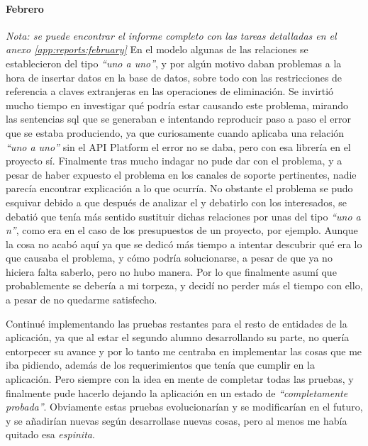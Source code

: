 \paragraph{Febrero}
\textit{Nota: se puede encontrar el informe completo con las tareas detalladas
en el anexo \ref{app:reports:february}}
En el modelo algunas de las relaciones se establecieron del tipo \textit{``uno a uno''},
y por algún motivo daban problemas a la hora de insertar datos en la base de datos,
sobre todo con las restricciones de referencia a claves extranjeras en las
operaciones de eliminación. Se invirtió mucho tiempo en investigar qué podría estar
causando este problema, mirando las sentencias \gls{sql} que se generaban e intentando
reproducir paso a paso el error que se estaba produciendo, ya que curiosamente cuando
aplicaba una relación \textit{``uno a uno''} sin el 
API Platform el error no se daba, pero con esa librería en el proyecto sí. Finalmente
tras mucho indagar no pude dar con el problema, y a pesar de haber expuesto
el problema en los canales de soporte pertinentes, nadie parecía encontrar explicación
a lo que ocurría. No obstante el problema se pudo esquivar debido a que después
de analizar el  y debatirlo con los
interesados, se debatió que tenía más sentido sustituir dichas relaciones por unas
del tipo \textit{``uno a n''}, como era en el caso de los presupuestos de un
proyecto, por ejemplo. Aunque la cosa no acabó aquí ya que se dedicó más tiempo a
intentar descubrir qué era lo que causaba el problema, y cómo podría solucionarse,
a pesar de que ya no hiciera falta saberlo, pero no hubo manera. Por lo que finalmente
asumí que probablemente se debería a mi torpeza, y decidí no perder más el tiempo con
ello, a pesar de no quedarme satisfecho.

Continué implementando las pruebas restantes para el resto de entidades de la aplicación,
ya que al estar el segundo alumno desarrollando su parte, no quería entorpecer su avance
y por lo tanto me centraba en implementar las cosas que me iba pidiendo, además de los
requerimientos que tenía que cumplir en la aplicación. Pero siempre con la idea en mente
de completar todas las pruebas, y finalmente pude hacerlo dejando la aplicación en un
estado de \textit{``completamente probada''}. Obviamente estas pruebas evolucionarían
y se modificarían en el futuro, y se añadirían nuevas según desarrollase nuevas cosas,
pero al menos me había quitado esa \textit{espinita}.

